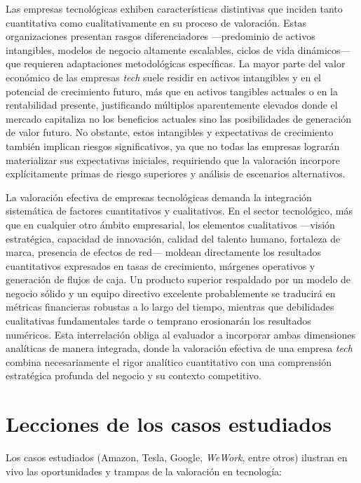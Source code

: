 Las empresas tecnológicas exhiben características distintivas que inciden tanto cuantitativa como cualitativamente en su proceso de valoración. Estas organizaciones presentan rasgos diferenciadores ---predominio de activos intangibles, modelos de negocio altamente escalables, ciclos de vida dinámicos--- que requieren adaptaciones metodológicas específicas. La mayor parte del valor económico de las empresas \emph{tech} suele residir en activos intangibles y en el potencial de crecimiento futuro, más que en activos tangibles actuales o en la rentabilidad presente, justificando múltiplos aparentemente elevados donde el mercado capitaliza no los beneficios actuales sino las posibilidades de generación de valor futuro. No obstante, estos intangibles y expectativas de crecimiento también implican riesgos significativos, ya que no todas las empresas lograrán materializar sus expectativas iniciales, requiriendo que la valoración incorpore explícitamente primas de riesgo superiores y análisis de escenarios alternativos.

La valoración efectiva de empresas tecnológicas demanda la integración sistemática de factores cuantitativos y cualitativos. En el sector tecnológico, más que en cualquier otro ámbito empresarial, los elementos cualitativos ---visión estratégica, capacidad de innovación, calidad del talento humano, fortaleza de marca, presencia de efectos de red--- moldean directamente los resultados cuantitativos expresados en tasas de crecimiento, márgenes operativos y generación de flujos de caja. Un producto superior respaldado por un modelo de negocio sólido y un equipo directivo excelente probablemente se traducirá en métricas financieras robustas a lo largo del tiempo, mientras que debilidades cualitativas fundamentales tarde o temprano erosionarán los resultados numéricos. Esta interrelación obliga al evaluador a incorporar ambas dimensiones analíticas de manera integrada, donde la valoración efectiva de una empresa \emph{tech} combina necesariamente el rigor analítico cuantitativo con una comprensión estratégica profunda del negocio y su contexto competitivo.

\section{Lecciones de los casos estudiados}

Los casos estudiados (Amazon, Tesla, Google, \emph{WeWork}, entre otros) ilustran en vivo las oportunidades y trampas de la valoración en tecnología:

